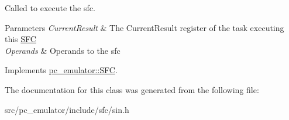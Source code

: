 Called to execute the sfc. 


\begin{DoxyParams}{Parameters}
{\em Current\+Result} & The Current\+Result register of the task executing this \hyperlink{classpc__emulator_1_1SFC}{S\+FC} \\
\hline
{\em Operands} & Operands to the sfc \\
\hline
\end{DoxyParams}


Implements \hyperlink{classpc__emulator_1_1SFC_ab206c80fc0e429c56672b4f6a0ca8635}{pc\+\_\+emulator\+::\+S\+FC}.



The documentation for this class was generated from the following file\+:\begin{DoxyCompactItemize}
\item 
src/pc\+\_\+emulator/include/sfc/sin.\+h\end{DoxyCompactItemize}

